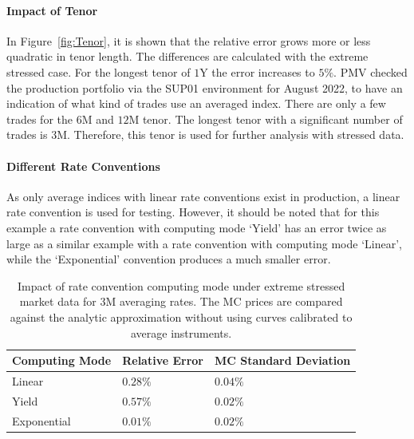\documentclass[]{pmv_report} %
\begin{document}
\paragraph{Impact of Tenor}
In Figure~\ref{fig:Tenor}, it is shown that the relative error grows more or less quadratic in tenor length.
The differences are calculated with the extreme stressed case.
For the longest tenor of $1$Y the error increases to $5\%$.
PMV checked the production portfolio via the SUP01 environment for August 2022, to have an indication of what kind of trades use an averaged index.
There are only a few trades for the $6$M and $12$M tenor.
The longest tenor with a significant number of trades is $3$M.
Therefore, this tenor is used for further analysis with stressed data.

\paragraph{Different Rate Conventions}
As only average indices with linear rate conventions exist in production, a linear rate convention is used for testing.
However, it should be noted that for this example a rate convention with computing mode `Yield' has an error twice as large as a similar example with a rate convention with computing mode `Linear', while the `Exponential' convention produces a much smaller error.

\begin{table}[H]
\footnotesize
\centering
\begin{tabular}{l|l|l}
  \toprule[0.05cm]
  \textbf{Computing Mode} & \textbf{Relative Error} & \textbf{MC Standard Deviation} \\
  \hline\hline
  Linear      & $0.28\%$ & $0.04\%$ \\ \hline
  Yield       & $0.57\%$ & $0.02\%$ \\ \hline
  Exponential & $0.01\%$ & $0.02\%$ \\
  \bottomrule[0.05cm]
\end{tabular}
\caption{Impact of rate convention computing mode under extreme stressed market data for $3$M averaging rates.
The MC prices are compared against the analytic approximation without using curves calibrated to average instruments.}
 \label{tab:rateConvs}
\end{table}
\end{document}
